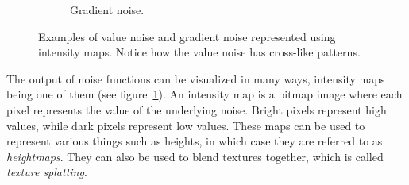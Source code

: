 \begin{figure}[h!]
\begin{subfigure}[b]{0.30\textwidth}
    \caption{Gradient noise. \cite{perlin_noise_img}}
  \end{subfigure}

  \caption{Examples of value noise and gradient noise represented using intensity maps. Notice how the value noise has cross-like patterns.}
  \label{fig:noisetypes}
\end{figure}

The output of noise functions can be visualized in many ways, intensity maps being one of them (see figure~\ref{fig:noisetypes}).
An intensity map is a bitmap image where each pixel represents the value of the underlying noise.
Bright pixels represent high values, while dark pixels represent low values.
These maps can be used to represent various things such as heights, in which case they are referred to as \textit{heightmaps}.
They can also be used to blend textures together, which is called \textit{texture splatting}.